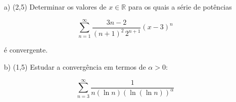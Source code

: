 \documentclass[12pt,a4paper]{article}
\begin{document}

\newpage
{}
\begin{itemize}
\item[a)] (2,5) Determinar os valores de $x \in \mathbb{R}$ para os quais a série de potências

$$ \sum_{n=1}^\infty \frac{3n-2}{(n+1)^2 \, 2^{n+1}} (x-3)^n $$

é convergente.

\item[b)] (1,5) Estudar a convergência em termos de $\alpha > 0$:

$$ \sum_{n=3}^\infty \frac{1}{n (\ln n)(\ln (\ln n))^\alpha} $$

\end{itemize}


\\
\end{document}
